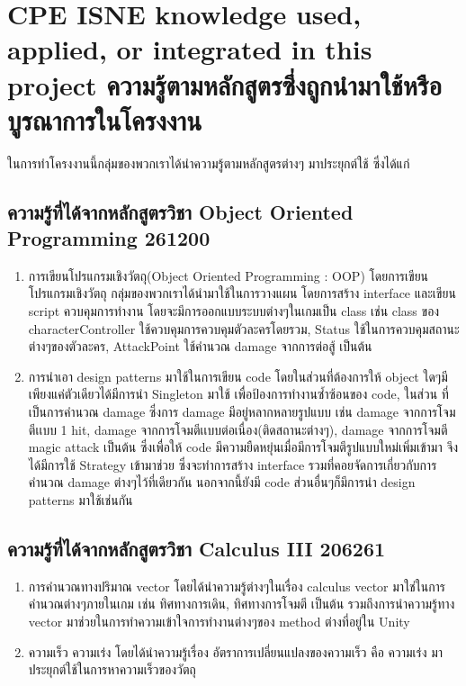 
\section{\ifenglish%
\ifcpe CPE \else ISNE \fi knowledge used, applied, or integrated in this project
\else%
ความรู้ตามหลักสูตรซึ่งถูกนำมาใช้หรือบูรณาการในโครงงาน
\fi
}
\enskip \enskip \enskip \enskip \enskip ในการทำโครงงานนี้กลุ่มของพวกเราได้นำความรู้ตามหลักสูตรต่างๆ มาประยุกต์ใช้ ซึ่งได้แก่
\subsection{ความรู้ที่ได้จากหลักสูตรวิชา Object Oriented Programming 261200}
\begin{enumerate}
\item การเขียนโปรแกรมเชิงวัตถุ(Object Oriented Programming : OOP) โดยการเขียนโปรแกรมเชิงวัตถุ กลุ่มของพวกเราได้นำมาใช้ในการวางแผน โดยการสร้าง interface และเขียน script ควบคุมการทำงาน โดยจะมีการออกแบบระบบต่างๆในเกมเป็น class 
เช่น class ของ characterController ใช้ควบคุมการควบคุมตัวละครโดยรวม, Status ใช้ในการควบคุมสถานะต่างๆของตัวละคร, AttackPoint ใช้คำนวณ damage จากการต่อสู้ เป็นต้น 
\item การนำเอา design patterns มาใช้ในการเขียน code โดยในส่วนที่ต้องการให้ object ใดๆมีเพียงแค่ตัวเดียวได้มีการนำ Singleton มาใช้ เพื่อป้องการทำงานซ้ำซ้อนของ code, ในส่วน
ที่เป็นการคำนวณ damage ซึ่งการ damage มีอยู่หลากหลายรูปแบบ เช่น damage จากการโจมตีเเบบ 1 hit, damage จากการโจมตีเเบบต่อเนื่อง(ติดสถานะต่างๆ), damage จากการโจมตี magic attack เป็นต้น
ซึ่งเพื่อให้ code มีความยืดหยุ่นเมื่อมีการโจมตีรูปแบบใหม่เพิ่มเข้ามา จึงได้มีการใช้ Strategy เข้ามาช่วย ซึ่งจะทำการสร้าง interface รวมที่คอยจัดการเกี่ยวกับการคำนวณ damage ต่างๆไว้ที่เดียวกัน นอกจากนี้ยังมี
code ส่วนอื่นๆก็มีการนำ design patterns มาใช้เช่นกัน
\end{enumerate}

\subsection{ความรู้ที่ได้จากหลักสูตรวิชา Calculus III 206261}
\begin{enumerate}
\item การคำนวณทางปริมาณ vector โดยได้นำความรู้ต่างๆในเรื่อง calculus vector มาใช่ในการคำนวณต่างๆภายในเกม เช่น ทิศทางการเดิน, ทิศทางการโจมตี เป็นต้น 
รวมถึงการนำความรู้ทาง vector มาช่วยในการทำความเข้าใจการทำงานต่างๆของ method ต่างที่อยู่ใน Unity
\item ความเร็ว ความเร่ง โดยได้นำความรู้เรื่อง อัตราการเปลี่ยนแปลงของความเร็ว คือ ความเร่ง มาประยุกต์ใช้ในการหาความเร็วของวัตถุ
\end{enumerate}

